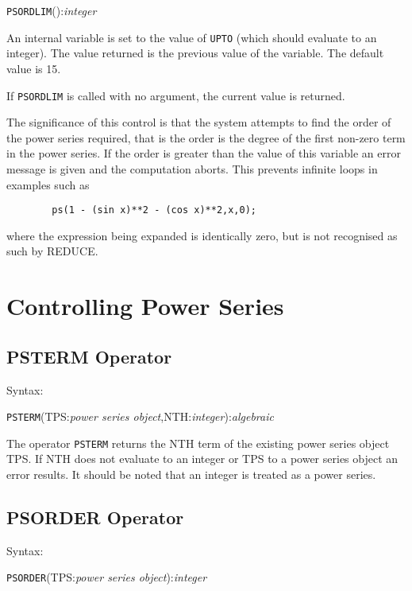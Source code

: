 \documentclass[11pt,letterpaper]{book}
\newcommand{\REDUCE}{REDUCE}
\begin{document}
\hspace*{2em} {\tt PSORDLIM}():{\em integer}

An internal variable is set to the value of {\tt UPTO} (which should
evaluate to an integer).  The value returned is the previous value of
the variable.  The default value is 15.

If {\tt PSORDLIM} is called with no argument, the current value is
returned.

The significance of this control is that the system attempts to find
the order of the power series required, that is the order is the
degree of the first non-zero term in the power series.  If the order
is greater than the value of this variable an error message is given
and the computation aborts.  This prevents infinite loops in examples
such as

{\small\begin{verbatim}
        ps(1 - (sin x)**2 - (cos x)**2,x,0);
\end{verbatim}}

where the expression being expanded is identically zero, but is not
recognised as such by \REDUCE.


\section{Controlling Power Series}
\subsection{PSTERM Operator}

Syntax:

\hspace*{2em} {\tt PSTERM}(TPS:{\em power series object},NTH:{\em integer}):{\em algebraic}

The operator {\tt PSTERM} returns the NTH term of the existing
power series object TPS. If NTH does not evaluate to
an integer or TPS to a power series object an error results.  It
should be noted that an integer is treated as a power series.


\subsection{PSORDER Operator}

Syntax:

\hspace*{2em} {\tt PSORDER}(TPS:{\em power series object}):{\em integer}
\end{document}
